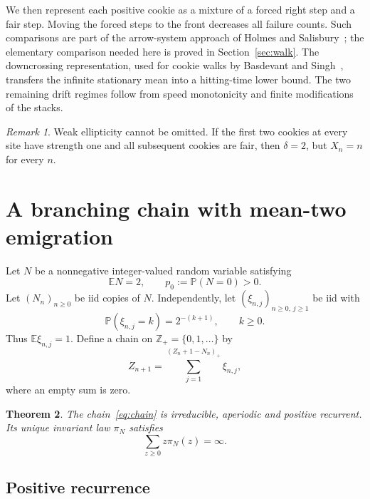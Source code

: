 \documentclass[11pt]{amsart}
\numberwithin{equation}{section}
\newtheorem{theorem}{Theorem}[section]
\theoremstyle{remark}
\newtheorem{remark}[theorem]{Remark}
\newcommand{\E}{\mathbb E}
\newcommand{\Pp}{\mathbb P}
\newcommand{\Z}{\mathbb Z}
\begin{document}
We then represent each positive cookie as a mixture of a forced right step and a fair step. Moving the forced steps to the front decreases all failure counts. Such comparisons are part of the arrow-system approach of Holmes and Salisbury~\cite{HS12}; the elementary comparison needed here is proved in Section~\ref{sec:walk}. The downcrossing representation, used for cookie walks by Basdevant and Singh~\cite{BS08}, transfers the infinite stationary mean into a hitting-time lower bound. The two remaining drift regimes follow from speed monotonicity and finite modifications of the stacks.

\begin{remark}\label{rem:wel}
Weak ellipticity cannot be omitted. If the first two cookies at every site have strength one and all subsequent cookies are fair, then $\delta=2$, but $X_n=n$ for every $n$.
\end{remark}

\section{A branching chain with mean-two emigration}\label{sec:emigration}

Let $N$ be a nonnegative integer-valued random variable satisfying
\begin{equation}\label{eq:N}
 \E N=2,\qquad p_0:=\Pp(N=0)>0.
\end{equation}
Let $(N_n)_{n\ge0}$ be iid copies of $N$. Independently, let $(\xi_{n,j})_{n\ge0,\,j\ge1}$ be iid with
\begin{equation}\label{eq:geom}
 \Pp(\xi_{n,j}=k)=2^{-(k+1)},\qquad k\ge0.
\end{equation}
Thus $\E\xi_{n,j}=1$. Define a chain on $\Z_+=\{0,1,\ldots\}$ by
\begin{equation}\label{eq:chain}
 Z_{n+1}=\sum_{j=1}^{(Z_n+1-N_n)_+}\xi_{n,j},
\end{equation}
where an empty sum is zero.

\begin{theorem}\label{thm:emigration}
The chain~\eqref{eq:chain} is irreducible, aperiodic and positive recurrent. Its unique invariant law $\pi_N$ satisfies
\begin{equation}\label{eq:infinite}
 \sum_{z\ge0}z\pi_N(z)=\infty.
\end{equation}
\end{theorem}

\subsection{Positive recurrence}
\end{document}
